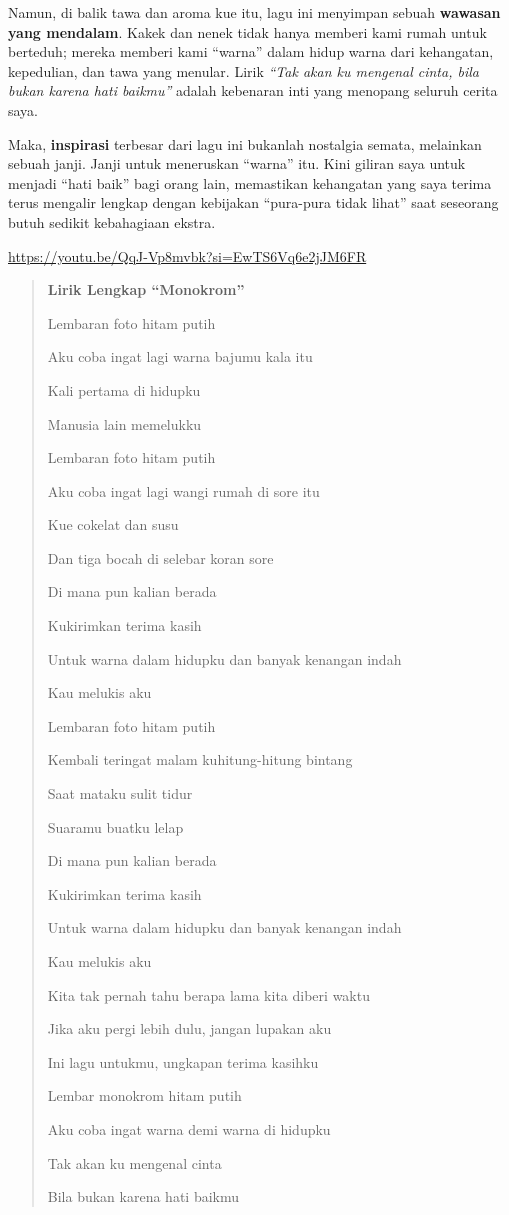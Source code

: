 \documentclass[
  letterpaper,
  DIV=11,
  numbers=noendperiod]{scrreprt}
\begin{document}
Namun, di balik tawa dan aroma kue itu, lagu ini menyimpan sebuah
\textbf{wawasan yang mendalam}. Kakek dan nenek tidak hanya memberi kami
rumah untuk berteduh; mereka memberi kami ``warna'' dalam hidup warna
dari kehangatan, kepedulian, dan tawa yang menular. Lirik \emph{``Tak
akan ku mengenal cinta, bila bukan karena hati baikmu''} adalah
kebenaran inti yang menopang seluruh cerita saya.

Maka, \textbf{inspirasi} terbesar dari lagu ini bukanlah nostalgia
semata, melainkan sebuah janji. Janji untuk meneruskan ``warna'' itu.
Kini giliran saya untuk menjadi ``hati baik'' bagi orang lain,
memastikan kehangatan yang saya terima terus mengalir lengkap dengan
kebijakan ``pura-pura tidak lihat'' saat seseorang butuh sedikit
kebahagiaan ekstra.

\url{https://youtu.be/QqJ-Vp8mvbk?si=EwTS6Vq6e2jJM6FR}

\begin{quote}
\textbf{Lirik Lengkap ``Monokrom''}

Lembaran foto hitam putih

Aku coba ingat lagi warna bajumu kala itu

Kali pertama di hidupku

Manusia lain memelukku

Lembaran foto hitam putih

Aku coba ingat lagi wangi rumah di sore itu

Kue cokelat dan susu

Dan tiga bocah di selebar koran sore

Di mana pun kalian berada

Kukirimkan terima kasih

Untuk warna dalam hidupku dan banyak kenangan indah

Kau melukis aku

Lembaran foto hitam putih

Kembali teringat malam kuhitung-hitung bintang

Saat mataku sulit tidur

Suaramu buatku lelap

Di mana pun kalian berada

Kukirimkan terima kasih

Untuk warna dalam hidupku dan banyak kenangan indah

Kau melukis aku

Kita tak pernah tahu berapa lama kita diberi waktu

Jika aku pergi lebih dulu, jangan lupakan aku

Ini lagu untukmu, ungkapan terima kasihku

Lembar monokrom hitam putih

Aku coba ingat warna demi warna di hidupku

Tak akan ku mengenal cinta

Bila bukan karena hati baikmu
\end{quote}
\end{document}
